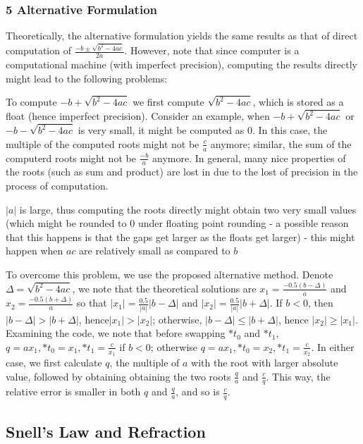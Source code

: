 \documentclass[10pt,letter]{scrartcl}
\theoremstyle{definition} %
\begin{document}
\subsubsection*{5 Alternative Formulation}%
Theoretically, the alternative formulation yields the same results as that of direct computation of $\frac{-b \pm \sqrt{b^2-4ac}}{2a}$. However, note that since computer is a computational machine (with imperfect precision), computing the results directly might lead to the following problems: 
\begin{compactenum}
\item To compute $-b + \sqrt{b^2-4ac}$ we first compute $\sqrt{b^2-4ac}$, which is stored as a float (hence imperfect precision). Consider an example, when $-b + \sqrt{b^2-4ac}$ or $-b - \sqrt{b^2-4ac}$ is very small, it might be computed as $0$. In this case, the multiple of the computed roots might not be $\frac{c}{a}$ anymore; similar, the sum of the computerd roots might not be $\frac{-b}{a}$ anymore. In general, many nice properties of the roots (such as sum and product) are lost in due to the lost of precision in the process of computation.
\item $|a|$ is large, thus computing the roots directly might obtain two very small values (which might be rounded to $0$ under floating point rounding - a possible reason that this happens is that the gaps get larger as the floats get larger) - this might happen when $ac$ are relatively small as compared to $b$
\end{compactenum}

To overcome this problem, we use the proposed alternative method. Denote $\Delta = \sqrt{b^2-4ac}$, we note that the theoretical solutions are $x_1 = \frac{-0.5(b - \Delta)}{a}$ and $x_2 = \frac{-0.5(b + \Delta)}{a}$ so that $|x_1| = \frac{0.5}{|a|}|b - \Delta|$ and $|x_2| = \frac{0.5}{|a|}|b + \Delta|$. If $b < 0$, then $|b - \Delta| > |b + \Delta|$, hence$|x_1| > |x_2|$; otherwise, $|b - \Delta| \le |b + \Delta|$, hence $|x_2| \ge |x_1|$. Examining the code, we note that before swapping $*t_0$ and $*t_1$, $q = ax_1, *t_0 = x_1, *t_1 = \frac{c}{x_1}$ if $b < 0$; otherwise $q = ax_1, *t_0 = x_2, *t_1 = \frac{c}{x_2}$. In either case, we first calculate $q$, the multiple of $a$ with the root with larger absolute value, followed by obtaining obtaining the two roots $\frac{q}{a}$ and $\frac{c}{q}$. This way, the relative error is smaller in both $q$ and $\frac{q}{a}$, and so is $\frac{c}{q}$.

\subsection*{Snell’s Law and Refraction}
\end{document}
